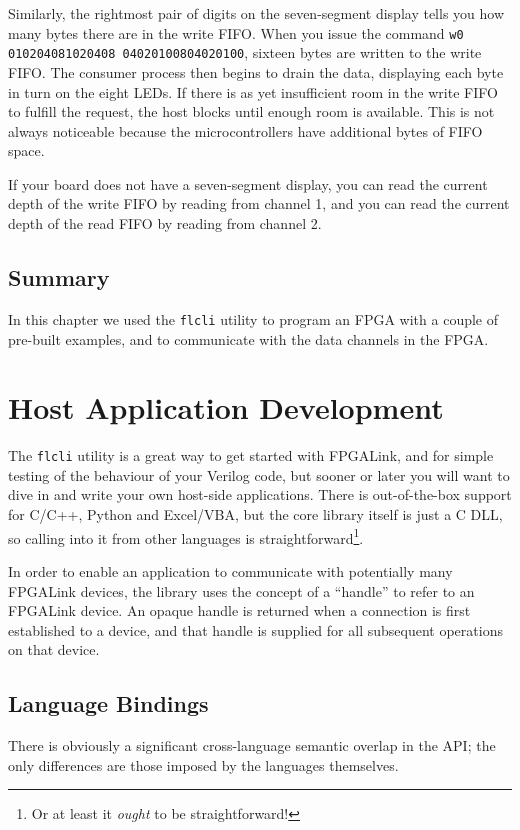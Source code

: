 Similarly, the rightmost pair of digits on the seven-segment display tells you how many bytes there are in the write FIFO. When you issue the command \texttt{w0 010204081020408 04020100804020100}, sixteen bytes are written to the write FIFO. The consumer process then begins to drain the data, displaying each byte in turn on the eight LEDs. If there is as yet insufficient room in the write FIFO to fulfill the request, the host blocks until enough room is available. This is not always noticeable because the microcontrollers have additional bytes of FIFO space.

If your board does not have a seven-segment display, you can read the current depth of the write FIFO by reading from channel 1, and you can read the current depth of the read FIFO by reading from channel 2.

\subsection{Summary}
In this chapter we used the \texttt{flcli} utility to program an FPGA with a couple of pre-built examples, and to communicate with the data channels in the FPGA.

\newpage
\section{Host Application Development}
The \texttt{flcli} utility is a great way to get started with FPGALink, and for simple testing of the behaviour of your Verilog code, but sooner or later you will want to dive in and write your own host-side applications. There is out-of-the-box support for C/C++, Python and Excel/VBA, but the core library itself is just a C DLL, so calling into it from other languages is straightforward\footnote{Or at least it \textit{ought} to be straightforward!}.

In order to enable an application to communicate with potentially many FPGALink devices, the library uses the concept of a ``handle'' to refer to an FPGALink device. An opaque handle is returned when a connection is first established to a device, and that handle is supplied for all subsequent operations on that device.

\subsection{Language Bindings}
There is obviously a significant cross-language semantic overlap in the API; the only differences are those imposed by the languages themselves.

